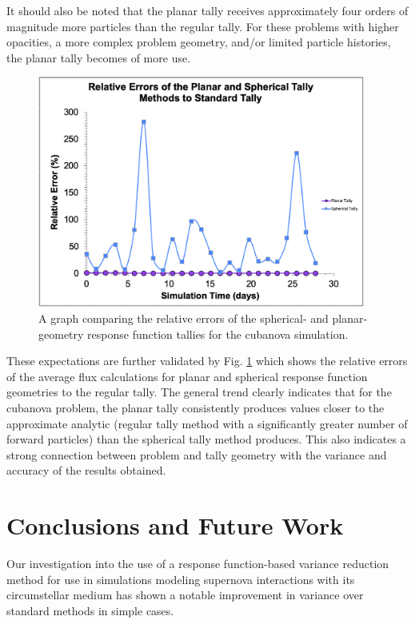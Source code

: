 It should also be noted that the planar tally receives approximately four orders of magnitude more particles than the regular tally. For these problems with higher opacities, a more complex problem geometry, and/or limited particle histories, the planar tally becomes of more use. 

\begin{figure} [h!]
	\centering
	\includegraphics[height=3in]{VarReduction/plots/relative_errors.png}
	\caption{A graph comparing the relative errors of the spherical- and planar-geometry response function tallies for the cubanova simulation. }
	\label{fig:relative_errors}
\end{figure}

These expectations are further validated by Fig. \ref{fig:relative_errors} which shows the relative errors of the average flux calculations for planar and spherical response function geometries to the regular tally. The general trend clearly indicates that for the cubanova problem, the planar tally consistently produces values closer to the approximate analytic (regular tally method with a significantly greater number of forward particles) than the spherical tally method produces. This also indicates a strong connection between problem and tally geometry with the variance and accuracy of the results obtained. 

\section{Conclusions and Future Work}
Our investigation into the use of a response function-based variance reduction method for use in simulations modeling supernova interactions with its circumstellar medium has shown a notable improvement in variance over standard methods in simple cases. 


